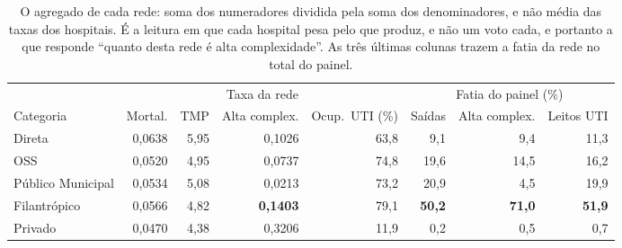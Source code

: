 \begin{table}[H]
\centering
\caption{O agregado de cada rede: soma dos numeradores dividida pela soma
dos denominadores, e não média das taxas dos hospitais. É a leitura em que
cada hospital pesa pelo que produz, e não um voto cada, e portanto a que
responde ``quanto desta rede é alta complexidade''. As três últimas colunas
trazem a fatia da rede no total do painel.}
\label{tab:agregado}
\small
\setlength{\tabcolsep}{4pt}
\begin{tabular}{lrrrrrrr}
\toprule
& \multicolumn{4}{c}{Taxa da rede} & \multicolumn{3}{c}{Fatia do painel (\%)} \\
\cmidrule(lr){2-5}\cmidrule(lr){6-8}
Categoria & Mortal. & TMP & Alta complex. & Ocup.\ UTI (\%) &
Saídas & Alta complex. & Leitos UTI \\
\midrule
Direta            & 0,0638 & 5,95 & 0,1026 & 63,8 & 9,1 & 9,4 & 11,3 \\
OSS               & 0,0520 & 4,95 & 0,0737 & 74,8 & 19,6 & 14,5 & 16,2 \\
Público Municipal & 0,0534 & 5,08 & 0,0213 & 73,2 & 20,9 & 4,5 & 19,9 \\
Filantrópico      & 0,0566 & 4,82 & \textbf{0,1403} & 79,1 & \textbf{50,2} & \textbf{71,0} & \textbf{51,9} \\
Privado           & 0,0470 & 4,38 & 0,3206 & 11,9 & 0,2 & 0,5 & 0,7 \\
\bottomrule
\end{tabular}
\end{table}



